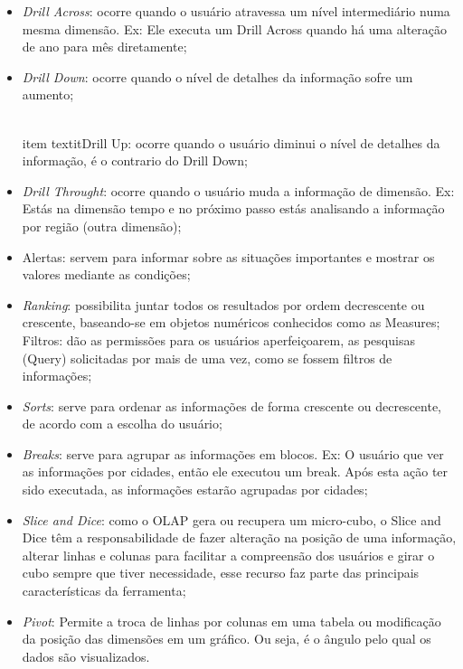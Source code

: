\begin{itemize}

    \item \textit{Drill Across}: ocorre quando o usuário atravessa um nível intermediário numa mesma dimensão. Ex: Ele executa um Drill Across quando há uma alteração de ano para mês diretamente;

    \item \textit{Drill Down}: ocorre quando o nível de detalhes da informação sofre um aumento;
    
    \\item textit{Drill Up}: ocorre quando o usuário diminui o nível de detalhes da informação, é o contrario do Drill Down;
    
    \item \textit{Drill Throught}: ocorre quando o usuário muda a informação de dimensão. Ex: Estás na dimensão tempo e no próximo passo estás analisando a informação por região (outra dimensão);
    
    \item Alertas: servem para informar sobre as situações importantes e mostrar os valores mediante as condições;
    
    \item \textit{Ranking}: possibilita juntar todos os resultados por ordem decrescente ou crescente, baseando-se em objetos numéricos conhecidos como as Measures;
    Filtros: d\~{a}o as permissões para os usuários aperfeiçoarem, as pesquisas (Query) solicitadas por mais de uma vez, como se fossem filtros de informações;
    
    \item \textit{Sorts}: serve para ordenar as informações de forma crescente ou decrescente, de acordo com a escolha do usuário;
    
    \item \textit{Breaks}: serve para agrupar as informações em blocos. Ex: O usuário que ver as informações por cidades, então ele executou um break. Após esta ação ter sido executada, as informações estarão agrupadas por cidades;
    
    \item \textit{Slice and Dice}: como o OLAP gera ou recupera um micro-cubo, o Slice and Dice têm a responsabilidade de fazer alteração na posição de uma informação, alterar linhas e colunas para facilitar a compreensão dos usuários e girar o cubo sempre que tiver necessidade, esse recurso faz parte das principais características da ferramenta;
    
    \item \textit{Pivot}: Permite a troca de linhas por colunas em uma tabela ou modificação da posição das dimensões em um gráfico. Ou seja, \'{e} o ângulo pelo qual os dados são visualizados.
    
\end{itemize}

